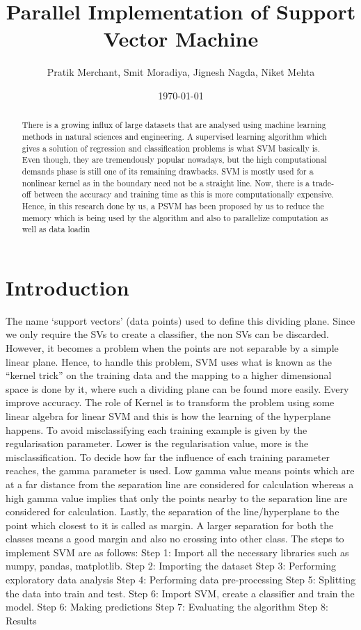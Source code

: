 \documentclass[aps,floatfix,prd,showpacs]{revtex4}
\begin{document}
\title{Parallel Implementation of Support Vector Machine}
\author{Pratik Merchant, Smit Moradiya, Jignesh Nagda, Niket Mehta}

\date{\today}

\begin{abstract}
There is a growing influx of large datasets that are analysed using machine learning methods in natural sciences and engineering. A supervised learning algorithm which gives a solution of regression and classification problems is what SVM basically is. Even though, they are tremendously popular nowadays, but the high computational demands phase is still one of its remaining drawbacks. SVM is mostly used for a nonlinear kernel as in the boundary need not be a straight line. Now, there is a trade-off between the accuracy and training time as this is more computationally expensive. Hence, in this research done by us, a PSVM has been proposed by us to reduce the memory which is being used by the algorithm and also to parallelize computation as well as data loadin
\end{abstract}
\maketitle

\section{Introduction}

The name ‘support vectors’ (data points) used to define this dividing plane. Since we only require the SVs to create a classifier, the non SVs can be discarded. However, it becomes a problem when the points are not separable by a simple linear plane. Hence, to handle this problem, SVM uses what is known as the “kernel trick” on the training data and the mapping to a higher dimensional space is done by it, where such a dividing plane can be found more easily. Every improve accuracy. The role of Kernel is to transform the problem using some linear algebra for linear SVM and this is how the learning of the hyperplane happens. To avoid misclassifying each training example is given by the regularisation parameter. Lower is the regularisation value, more is the misclassification. To decide how far the influence of each training parameter reaches, the gamma parameter is used. Low gamma value means points which are at a far distance from the separation line are considered for calculation whereas a high gamma value implies that only the points nearby to the separation line are considered for calculation. Lastly, the separation of the line/hyperplane to the point which closest to it is called as margin. A larger separation for both the classes means a good margin and also no crossing into other class.
The steps to implement SVM are as follows: Step 1: Import all the necessary libraries such as numpy, pandas, matplotlib. Step 2: Importing the dataset Step 3: Performing exploratory data analysis Step 4: Performing data pre-processing Step 5: Splitting the data into train and test. Step 6: Import SVM, create a classifier and train the model. Step 6: Making predictions Step 7: Evaluating the algorithm  Step 8: Results 
\end{document}
